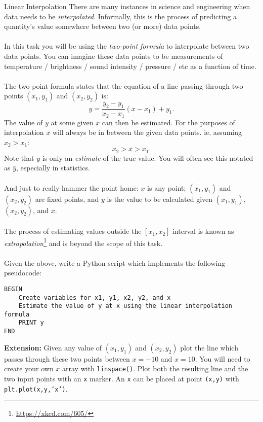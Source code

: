 \documentclass{lab}
\begin{document}
\begin{task}{Linear Interpolation}{}
There are many instances in science and engineering when data needs to be \textit{interpolated}. Informally, this is the process of predicting a quantity's value somewhere between two (or more) data points.
\\ \\
In this task you will be using the \textit{two-point formula} to interpolate between two data points. You can imagine these data points to be measurements of temperature / brightness / sound intensity / pressure / etc as a function of time.\\ \\
The two-point formula states that the equation of a line passing through two points $(x_1, y_1)$ and $(x_2, y_2)$ is:
\begin{equation}
y = \frac{y_2 - y_1}{x_2 - x_1}(x - x_1) + y_1.
\end{equation}
The value of $y$ at some given $x$ can then be estimated. For the purposes of interpolation $x$ will always be in between the given data points. ie, assuming $x_2 > x_1$:
\begin{equation}
x_2 > x > x_1.
\end{equation}
Note that $y$ is only an \textit{estimate} of the true value. You will often see this notated as $\hat{y}$, especially in statistics.
\\ \\
And just to really hammer the point home: $x$ is any point; $(x_1,y_1)$ and $(x_2, y_2)$ are fixed points, and $y$ is the value to be calculated given $(x_1,y_1)$, $(x_2, y_2)$, and $x$.
\\ \\
The process of estimating values outside the $[x_1, x_2]$ interval is known as \textit{extrapolation}\footnote{\url{https://xkcd.com/605/}} and is beyond the scope of this task.
\\ \\
Given the above, write a Python script which implements the following pseudocode:
\begin{lstlisting}[style=pseudo]
BEGIN
	Create variables for x1, y1, x2, y2, and x
	Estimate the value of y at x using the linear interpolation formula
	PRINT y
END
\end{lstlisting}

\textbf{Extension:} Given any value of $(x_1,y_1)$ and $(x_2, y_2)$ plot the line which passes through these two points between $x=-10$ and $x=10$. You will need to create your own $x$ array with \texttt{linspace()}. Plot both the resulting line and the two input points with an \texttt{x} marker. An \texttt{x} can be placed at point \texttt{(x,y)} with \texttt{plt.plot(x,y,'x')}.

\end{task}
\end{document}
